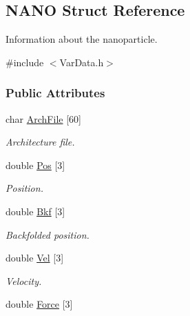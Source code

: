 \hypertarget{structNANO}{}\subsection{N\+A\+NO Struct Reference}
\label{structNANO}


Information about the nanoparticle.  




{\ttfamily \#include $<$Var\+Data.\+h$>$}

\subsubsection*{Public Attributes}
\begin{DoxyCompactItemize}
\item 
char \hyperlink{structNANO_a750f14eafb9dc7737d8524501eeef457}{Arch\+File} \mbox{[}60\mbox{]}\hypertarget{structNANO_a750f14eafb9dc7737d8524501eeef457}{}\label{structNANO_a750f14eafb9dc7737d8524501eeef457}

\begin{DoxyCompactList}\small\item\em Architecture file. \end{DoxyCompactList}\item 
double \hyperlink{structNANO_a863738e46f14b3bfc674ad87d35f143d}{Pos} \mbox{[}3\mbox{]}\hypertarget{structNANO_a863738e46f14b3bfc674ad87d35f143d}{}\label{structNANO_a863738e46f14b3bfc674ad87d35f143d}

\begin{DoxyCompactList}\small\item\em Position. \end{DoxyCompactList}\item 
double \hyperlink{structNANO_a77abbc20fd99f1fb464e7a922e543e19}{Bkf} \mbox{[}3\mbox{]}\hypertarget{structNANO_a77abbc20fd99f1fb464e7a922e543e19}{}\label{structNANO_a77abbc20fd99f1fb464e7a922e543e19}

\begin{DoxyCompactList}\small\item\em Backfolded position. \end{DoxyCompactList}\item 
double \hyperlink{structNANO_ae3fae9edc78d8cadc33c5a52bebdb46c}{Vel} \mbox{[}3\mbox{]}\hypertarget{structNANO_ae3fae9edc78d8cadc33c5a52bebdb46c}{}\label{structNANO_ae3fae9edc78d8cadc33c5a52bebdb46c}

\begin{DoxyCompactList}\small\item\em Velocity. \end{DoxyCompactList}\item 
double \hyperlink{structNANO_ad597aadcc443ffa959ac837ba5382bff}{Force} \mbox{[}3\mbox{]}\hypertarget{structNANO_ad597aadcc443ffa959ac837ba5382bff}{}\label{structNANO_ad597aadcc443ffa959ac837ba5382bff}


\end{DoxyCompactItemize}
